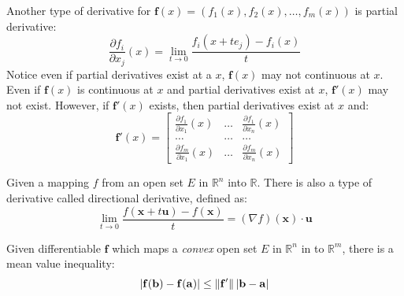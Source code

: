 Another type of derivative for $\mathbf{f}(x)=(f_1(x),f_2(x),\dots,f_m(x))$ is partial derivative:
\begin{equation*}
    \frac{\partial f_i}{\partial x_j}(x)=\lim_{t\to 0}\frac{f_i(x+te_j)-f_i(x)}{t}
\end{equation*}
Notice even if partial derivatives exist at a $x$, $\mathbf{f}(x)$ may not continuous at $x$. Even if $\mathbf{f}(x)$ is continuous at $x$ and partial derivatives exist at $x$, $\mathbf{f}'(x)$ may not exist. However, if $\mathbf{f}'(x)$ exists, then  partial derivatives exist at $x$ and:
\begin{equation*}
\mathbf{f}'(x)=
\begin{bmatrix}     
    \frac{\partial f_1}{\partial x_1}(x)&\dots&\frac{\partial f_1}{\partial x_n}(x)\\
    \dots&\dots&\dots\\
    \frac{\partial f_m}{\partial x_1}(x)&\dots&\frac{\partial f_m}{\partial x_n}(x)
\end{bmatrix}
\end{equation*}\par
Given a mapping $f$ from an open set $E$ in $\mathbb{R}^n$ into $\mathbb{R}$. There is also a type of derivative called directional derivative, defined as:
\begin{equation*}
    \lim_{t\to 0}\frac{f(\mathbf{x}+t\mathbf{u})-f(\mathbf{x})}{t}=(\nabla f)(\mathbf{x})\cdot \mathbf{u}
\end{equation*}\par
Given differentiable $\mathbf{f}$ which maps a \emph{convex} open set $E$ in $\mathbb{R}^n$ in to $\mathbb{R}^m$, there is a mean value inequality:
\begin{equation*}
    \left\lvert\mathbf{f}(\mathbf{b})-\mathbf{f}(\mathbf{a})\right\rvert\leq \lVert\mathbf{f}'\rVert\left\lvert\mathbf{b}-\mathbf{a}\right\rvert
\end{equation*}

